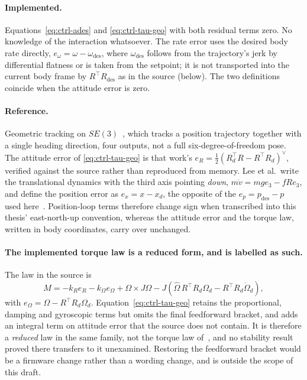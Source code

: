 \paragraph{Implemented.} Equations~\eqref{eq:ctrl-ades} and \eqref{eq:ctrl-tau-geo} with both
residual terms zero. No knowledge of the interaction whatsoever.
The rate error uses the desired body rate directly, $e_\omega = \omega - \omega_{\mathrm{des}}$,
where $\omega_{\mathrm{des}}$ follows from the trajectory's jerk by differential flatness or is taken
from the setpoint; it is not transported into the current body frame by $R^\top R_{\mathrm{des}}$ as
in the source (below). The two definitions coincide when the attitude error is zero.

\paragraph{Reference.} Geometric tracking on $SE(3)$~\cite{lee2010geometrictracking}, which tracks
a position trajectory together with a single heading direction, four outputs, not a full
six-degree-of-freedom pose. The attitude error of \eqref{eq:ctrl-tau-geo} is that work's
$e_R = \tfrac{1}{2}(R_d^\top R - R^\top R_d)^\vee$, verified against the source rather than
reproduced from memory.
Lee et al.\ write the translational dynamics with the third axis pointing \emph{down},
$m\dot v = mge_3 - fRe_3$, and define the position error as $e_x = x - x_d$, the opposite of the
$e_p = p_{\mathrm{des}} - p$ used here~\cite{lee2010geometricse3}. Position-loop terms therefore change
sign when transcribed into this thesis' east-north-up convention, whereas the attitude error and
the torque law, written in body coordinates, carry over unchanged.

\paragraph{The implemented torque law is a reduced form, and is labelled as such.} The law in the
source is
%
\begin{equation}
  M = -k_R e_R - k_\Omega e_\Omega + \Omega \times J\Omega
      - J\!\left( \hat{\Omega}\, R^\top R_d \Omega_d - R^\top R_d \dot{\Omega}_d \right),
  \label{eq:ctrl-tau-lee}
\end{equation}
%
with $e_\Omega = \Omega - R^\top R_d \Omega_d$. Equation~\eqref{eq:ctrl-tau-geo} retains the
proportional, damping and gyroscopic terms but omits the final feedforward bracket, and adds an
integral term on attitude error that the source does not contain. It is therefore a
\emph{reduced} law in the same family, not the torque law of~\cite{lee2010geometrictracking}, and
no stability result proved there transfers to it unexamined. Restoring the feedforward bracket
would be a firmware change rather than a wording change, and is outside the scope of this draft.

